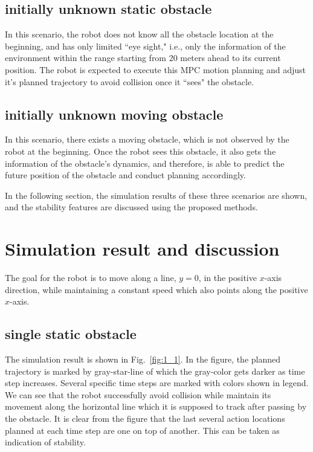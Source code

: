\subsection{initially unknown static obstacle}
In this scenario, the robot does not know all the obstacle location at the beginning, and has only limited ``eye sight," i.e., only the information of the environment within the range starting from 20 meters ahead to its current position. The robot is expected to execute this MPC motion planning and adjust it's planned trajectory to avoid collision once it ``sees" the obstacle.

\subsection{initially unknown moving obstacle}
In this scenario, there exists a moving obstacle, which is not observed by the robot at the beginning. Once the robot sees this obstacle, it also gets the information of the obstacle's dynamics, and therefore, is able to predict the future position of the obstacle and conduct planning accordingly. 

In the following section, the simulation results of these three scenarios are shown, and the stability features are discussed using the proposed methods.



\section{Simulation result and discussion}

The goal for the robot is to move along a line, $y=0$, in the positive $x$-axis direction, while maintaining a constant speed which also points along the positive $x$-axis. 
\subsection{single static obstacle}
The simulation result is shown in Fig.~\ref{fig:1_1}. In the figure, the planned trajectory is marked by gray-star-line of which the gray-color gets darker as time step increases. Several specific time steps are marked with colors shown in legend. We can see that the robot successfully avoid collision while maintain its movement along the horizontal line which it is supposed to track after passing by the obstacle. It is clear from the figure that the last several action locations planned at each time step are one on top of another. This can be taken as indication of stability. 

